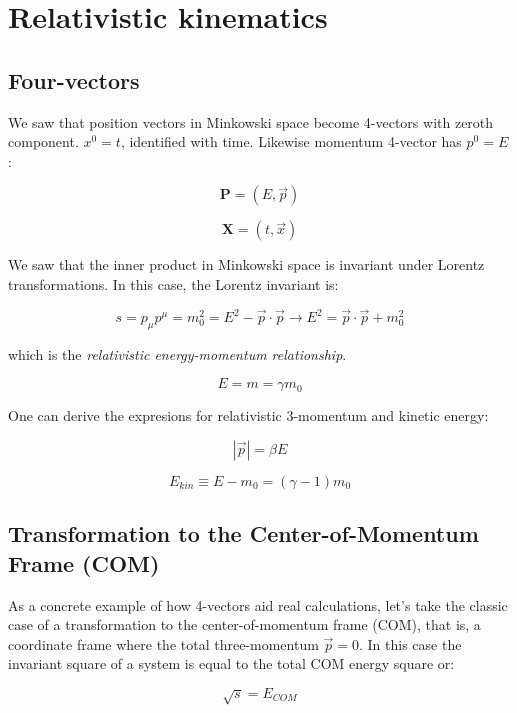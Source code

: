 \documentclass[
  letterpaper,
  DIV=11,
  numbers=noendperiod]{scrreprt}
\begin{document}
\section*{Relativistic kinematics}\label{relativistic-kinematics}


\subsection*{Four-vectors}\label{four-vectors}

We saw that position vectors in Minkowski space become 4-vectors with
zeroth component. \(x^0 = t\), identified with time. Likewise momentum
4-vector has \(p^0 = E\):

\[ {\mathbf P} = (E, \vec{p})\]

\[ {\mathbf X} = (t, \vec{x})\]

We saw that the inner product in Minkowski space is invariant under
Lorentz transformations. In this case, the Lorentz invariant is:

\[  s = p_\mu p^{\mu} = m_0^2 = E^2 -{\vec p\cdot \vec p} \rightarrow E^2 = {\vec p\cdot \vec p} +m_0^2\]

which is the \emph{relativistic energy-momentum relationship}.

\[ E = m = \gamma m_0\]

One can derive the expresions for relativistic 3-momentum and kinetic
energy:

\[|{\vec p}|= \beta E\]

\[E_{kin} \equiv E - m_0 = (\gamma -1) m_0\]

\subsection*{Transformation to the Center-of-Momentum Frame
(COM)}\label{transformation-to-the-center-of-momentum-frame-com}

As a concrete example of how 4-vectors aid real calculations, let's take
the classic case of a transformation to the center-of-momentum frame
(COM), that is, a coordinate frame where the total three-momentum
\(\vec p = 0\). In this case the invariant square of a system is equal
to the total COM energy square or:

\[\sqrt{s} = E_{COM}\]
\end{document}
